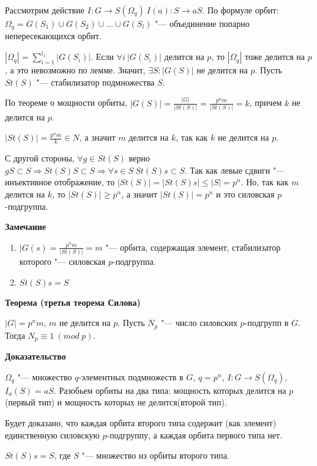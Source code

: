 \documentclass{article}
\begin{document}
Рассмотрим действие $I: G \rightarrow S(\Omega_q) \  I(a): S \rightarrow aS$. По формуле орбит: $\Omega_q = G(S_1) \cup G(S_2) \cup ... \cup G(S_l)$ "--- объединение попарно непересекающихся орбит.

$|\Omega_q| = \sum \limits_{i = 1}^{l_1} |G(S_i)|$. Если $\forall i \  |G(S_i)|$ делится на $p$, то $|\Omega_q|$ тоже делится на $p$, а это невозможно по лемме. Значит, $\exists S: |G(S)|$ не делится на $p$. Пусть $St(S)$ "--- стабилизатор подмножества $S$. 

По теореме о мощности орбиты, $|G(S)| = \frac{|G|}{|St(S)|} = \frac{p^nm}{|St(S)|} = k$, причем $k$ не делится на $p$.

$|St(S)| = \frac{p^nm}{k} \in N$, а значит $m$ делится на $k$, так как $k$ не делится на $p$.

С другой стороны, $\forall g \in St(S)$ верно $gS \subset S \Rightarrow St(S)S \subset S \Rightarrow \forall s \in S \  St(S)s \subset S$. Так как левые сдвиги "--- инъективное отображение, то $|St(S)| = |St(S)s| \leq |S| = p^n$. Но, так как $m$ делится на $k$, то $|St(S)| \geq p^n$, а значит $|St(S)| = p^n$ и это силовская $p$-подгруппа.

\vspace{10pt}

\textbf{Замечание}
\begin{enumerate}
	\item $|G(s) = \frac{p^nm}{|St(S)|} = m$ "--- орбита, содержащая элемент, стабилизатор которого "--- силовская $p$-подгруппа.
	\item $St(S)s = S$
\end{enumerate}

\vspace{10pt}

\textbf{Теорема (третья теорема Силова)}

$|G| = p^nm$, $m$ не делится на $p$. Пусть $N_p$ "--- число силовских $p$-подгрупп в $G$. Тогда $N_p \equiv 1 \ (mod \  p)$.

\textbf{Доказательство}

$\Omega_q$ "--- множество $q$-элементных подмножеств в $G$, $q = p^n$, $I: G \rightarrow S(\Omega_q)$, $I_a(S) = aS$. Разобьем орбиты на два типа: мощность которых делится на $p$ (первый тип) и мощность которых не делится(второй тип).

Будет доказано, что каждая орбита второго типа содержит (как элемент) единственную силовскую $p$-подгруппу, а каждая орбита первого типа нет.

$St(S)s = S$, где $S$ "--- множество из орбиты второго типа.
\end{document}
